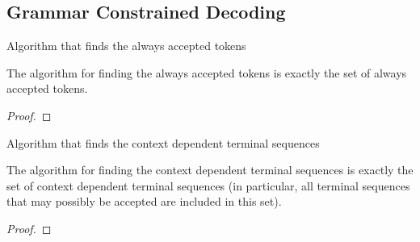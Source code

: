 
\subsection{Grammar Constrained Decoding}

\begin{definition}
    \label{def:FindAlwaysAccepted}
    \leanok
    Algorithm that finds the always accepted tokens
\end{definition}


\begin{lemma}
    \label{lem:FindAlwaysAcceptedCorrect}
    \leanok
    The algorithm for finding the always accepted tokens is exactly the set of always accepted tokens.
\end{lemma}
\begin{proof}
    \leanok
\end{proof}

\begin{definition}
    \label{def:FindContextDependentTerminalSequences}
    \leanok
    Algorithm that finds the context dependent terminal sequences 
\end{definition}

\begin{lemma}
    \label{lem:FindContextDependentCorrect}
    \leanok
    The algorithm for finding the context dependent terminal sequences is exactly the set of context dependent terminal sequences (in particular, all terminal sequences that may possibly be accepted are included in this set).
\end{lemma}
\begin{proof} \leanok \end{proof}

